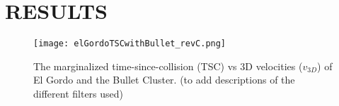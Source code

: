 \documentclass[letterpaper,useAMS,usenatbib]{"mn2e"}
\begin{document}
%



\section{RESULTS} 
\begin{figure} 
	\texttt{[image: elGordoTSCwithBullet\_revC.png]}
	\caption{The marginalized time-since-collision (TSC) vs 3D
velocities ($v_{3D}$) of El Gordo and the Bullet Cluster. (to add
descriptions of the different filters used) }
\end{figure}
\end{document}
